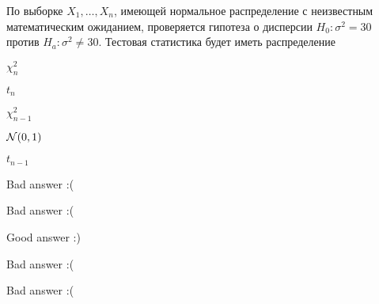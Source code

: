 
\begin{question}
По выборке \(X_1,\ldots,X_{n}\), имеющей нормальное распределение с
неизвестным математическим ожиданием, проверяется гипотеза о дисперсии
\(H_0: \sigma^2 = 30\) против \(H_a: \sigma^2 \ne 30\). Тестовая
статистика будет иметь распределение
\begin{answerlist}
  \item \(\chi^2_{n}\)
  \item \(t_n\)
  \item \(\chi^2_{n-1}\)
  \item \(\mathcal{N}(0,1)\)
  \item \(t_{n-1}\)
\end{answerlist}
\end{question}

\begin{solution}
\begin{answerlist}
  \item Bad answer :(
  \item Bad answer :(
  \item Good answer :)
  \item Bad answer :(
  \item Bad answer :(
\end{answerlist}
\end{solution}

